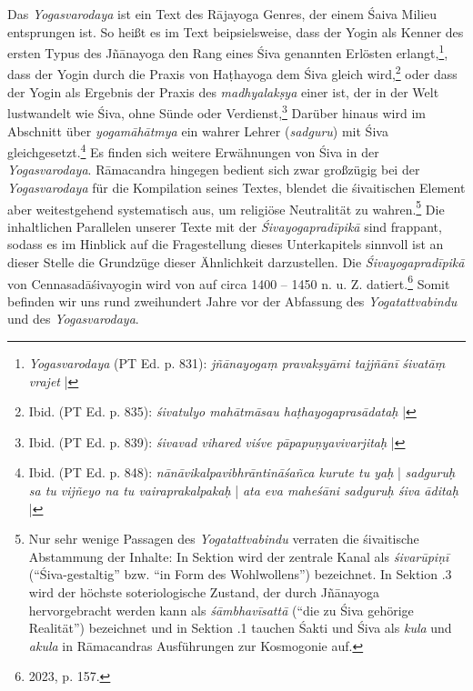Das \textit{Yogasvarodaya} ist ein Text des Rājayoga Genres, der einem Śaiva Milieu entsprungen ist. So heißt es im Text beipsielsweise, dass der Yogin als Kenner des ersten Typus des Jñānayoga den Rang eines Śiva genannten Erlösten erlangt,\footnote{ \textit{Yogasvarodaya} (PT Ed. p. 831): \textit{jñānayogaṃ pravakṣyāmi tajjñānī śivatāṃ vrajet} |}, dass der Yogin durch die Praxis von Haṭhayoga dem Śiva gleich wird,\footnote{Ibid. (PT Ed. p. 835): \textit{śivatulyo mahātmāsau haṭhayogaprasādataḥ} |} oder dass der Yogin als Ergebnis der Praxis des \textit{madhyalakṣya} einer ist, der in der Welt lustwandelt wie Śiva, ohne Sünde oder Verdienst,\footnote{Ibid. (PT Ed. p. 839): \textit{śivavad vihared viśve pāpapuṇyavivarjitaḥ} |} Darüber hinaus wird im Abschnitt über \textit{yogamāhātmya} ein wahrer Lehrer (\textit{sadguru}) mit Śiva gleichgesetzt.\footnote{Ibid. (PT Ed. p. 848): \textit{nānāvikalpavibhrāntināśañca kurute tu yaḥ} | \textit{sadguruḥ sa tu vijñeyo na tu vairaprakalpakaḥ} | \textit{ata eva maheśāni sadguruḥ śiva āditaḥ} |} Es finden sich weitere Erwähnungen von Śiva in der \textit{Yogasvarodaya}. Rāmacandra hingegen bedient sich zwar großzügig bei der \textit{Yogasvarodaya} für die Kompilation seines Textes, blendet die śivaitischen Element aber weitestgehend systematisch aus, um religiöse Neutralität zu wahren.\footnote{Nur sehr wenige Passagen des \textit{Yogatattvabindu} verraten die śivaitische Abstammung der Inhalte: In Sektion  wird der zentrale Kanal als \textit{śivarūpiṇī} (``Śiva-gestaltig'' bzw. ``in Form des Wohlwollens'') bezeichnet. In Sektion .3 wird der höchste soteriologische Zustand, der durch Jñānayoga hervorgebracht werden kann als \textit{śāmbhavīsattā} (``die zu Śiva gehörige Realität'') bezeichnet und in Sektion .1 tauchen Śakti und Śiva als \textit{kula} und \textit{akula} in Rāmacandras Ausführungen zur Kosmogonie auf.}   
Die inhaltlichen Parallelen unserer Texte mit der \textit{Śivayogapradīpikā} sind frappant, sodass es im Hinblick auf die Fragestellung dieses Unterkapitels sinnvoll ist an dieser Stelle die Grundzüge dieser Ähnlichkeit darzustellen. Die \textit{Śivayogapradīpikā} von Cennasadāśivayogin wird von \citeauthor{powell2023} auf circa 1400 – 1450 n. u. Z. datiert.\footnote{\citeauthor{powell2023} 2023, p. 157.} Somit befinden wir uns rund zweihundert Jahre vor der Abfassung des \textit{Yogatattvabindu} und des \textit{Yogasvarodaya}. 

